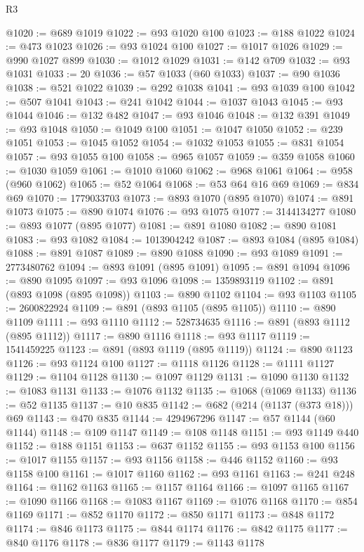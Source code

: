 \begin{lexlean}{R3}
\begin{coremodule}
@1020 := @689 @1019
@1022 := @93 @1020 @100
@1023 := @188 @1022
@1024 := @473 @1023
@1026 := @93 @1024 @100
@1027 := @1017 @1026
@1029 := @990 @1027 @899
@1030 := @1012 @1029
@1031 := @142 @709
@1032 := @93 @1031
@1033 := 20
@1036 := @57 @1033 (@60 @1033)
@1037 := @90 @1036
@1038 := @521 @1022
@1039 := @292 @1038
@1041 := @93 @1039 @100
@1042 := @507 @1041
@1043 := @241 @1042
@1044 := @1037 @1043
@1045 := @93 @1044
@1046 := @132 @482
@1047 := @93 @1046
@1048 := @132 @391
@1049 := @93 @1048
@1050 := @1049 @100
@1051 := @1047 @1050
@1052 := @239 @1051
@1053 := @1045 @1052
@1054 := @1032 @1053
@1055 := @831 @1054
@1057 := @93 @1055 @100
@1058 := @965 @1057
@1059 := @359 @1058
@1060 := @1030 @1059
@1061 := @1010 @1060
@1062 := @968 @1061
@1064 := @958 (@960 @1062)
@1065 := @52 @1064
@1068 := @53 @64 @16 @69
@1069 := @834 @69
@1070 := 1779033703
@1073 := @893 @1070 (@895 @1070)
@1074 := @891 @1073
@1075 := @890 @1074
@1076 := @93 @1075
@1077 := 3144134277
@1080 := @893 @1077 (@895 @1077)
@1081 := @891 @1080
@1082 := @890 @1081
@1083 := @93 @1082
@1084 := 1013904242
@1087 := @893 @1084 (@895 @1084)
@1088 := @891 @1087
@1089 := @890 @1088
@1090 := @93 @1089
@1091 := 2773480762
@1094 := @893 @1091 (@895 @1091)
@1095 := @891 @1094
@1096 := @890 @1095
@1097 := @93 @1096
@1098 := 1359893119
@1102 := @891 (@893 @1098 (@895 @1098))
@1103 := @890 @1102
@1104 := @93 @1103
@1105 := 2600822924
@1109 := @891 (@893 @1105 (@895 @1105))
@1110 := @890 @1109
@1111 := @93 @1110
@1112 := 528734635
@1116 := @891 (@893 @1112 (@895 @1112))
@1117 := @890 @1116
@1118 := @93 @1117
@1119 := 1541459225
@1123 := @891 (@893 @1119 (@895 @1119))
@1124 := @890 @1123
@1126 := @93 @1124 @100
@1127 := @1118 @1126
@1128 := @1111 @1127
@1129 := @1104 @1128
@1130 := @1097 @1129
@1131 := @1090 @1130
@1132 := @1083 @1131
@1133 := @1076 @1132
@1135 := @1068 (@1069 @1133)
@1136 := @52 @1135
@1137 := @10 @835
@1142 := @682 (@214 (@1137 (@373 @18))) @69
@1143 := @470 @835
@1144 := 4294967296
@1147 := @57 @1144 (@60 @1144)
@1148 := @109 @1147
@1149 := @108 @1148
@1151 := @93 @1149 @440
@1152 := @188 @1151
@1153 := @637 @1152
@1155 := @93 @1153 @100
@1156 := @1017 @1155
@1157 := @93 @1156
@1158 := @446 @1152
@1160 := @93 @1158 @100
@1161 := @1017 @1160
@1162 := @93 @1161
@1163 := @241 @248
@1164 := @1162 @1163
@1165 := @1157 @1164
@1166 := @1097 @1165
@1167 := @1090 @1166
@1168 := @1083 @1167
@1169 := @1076 @1168
@1170 := @854 @1169
@1171 := @852 @1170
@1172 := @850 @1171
@1173 := @848 @1172
@1174 := @846 @1173
@1175 := @844 @1174
@1176 := @842 @1175
@1177 := @840 @1176
@1178 := @836 @1177
@1179 := @1143 @1178

\end{coremodule}
\end{lexlean}
